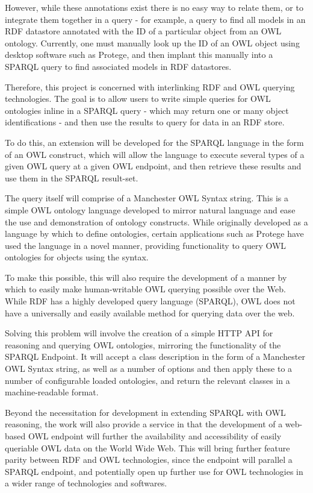 \documentclass{article}
\begin{document}
However, while these annotations exist there is no easy way to relate them, or
to integrate them together in a query - for example, a query to find all models
in an RDF datastore annotated with the ID of a particular object from an OWL
ontology. Currently, one must manually look up the ID of an OWL object using
desktop software such as Protege, and then implant this manually into a SPARQL
query to find associated models in RDF datastores.

Therefore, this project is concerned with interlinking RDF and OWL querying
technologies. The goal is to allow users to write simple queries for OWL
ontologies inline in a SPARQL query - which may return one or many object
identifications - and then use the results to query for data in an RDF store.

To do this, an extension will be developed for the SPARQL language in the form
of an OWL construct, which will allow the language to execute several types of a 
given OWL query at a given OWL endpoint, and then retrieve these results and use 
them in the SPARQL result-set.

The query itself will comprise of a Manchester OWL Syntax\cite{manchesterowl}
string. This is a simple OWL ontology
language developed to mirror natural language and ease the use and demonstration
of ontology constructs. While originally developed as a
language by which to define ontologies, certain applications such as
Protege have used the language in a novel manner, providing functionality to
query OWL ontologies for objects using the syntax.

To make this possible, this will also require the development of a manner by
which to easily make human-writable OWL querying possible over the Web. While 
RDF has a highly developed query language (SPARQL), OWL does not have a 
universally and easily available method for querying data over the web. 

Solving this problem will involve the creation of a simple HTTP API for reasoning 
and querying OWL ontologies, mirroring the functionality of the SPARQL Endpoint. 
It will accept a class description in the
form of a Manchester OWL Syntax string, as well as a number of options and then
apply these to a number of configurable loaded ontologies, and return the
relevant classes in a machine-readable format. 

Beyond the necessitation for development in extending SPARQL with OWL reasoning, 
the work will also provide a service in that the development of a web-based OWL 
endpoint will further the availability and accessibility of easily queriable
OWL data on the World Wide Web. This will bring further feature parity between
RDF and OWL technologies, since the endpoint will parallel a SPARQL endpoint,
and potentially open up further use for OWL technologies in a wider range of
technologies and softwares.
\end{document}
